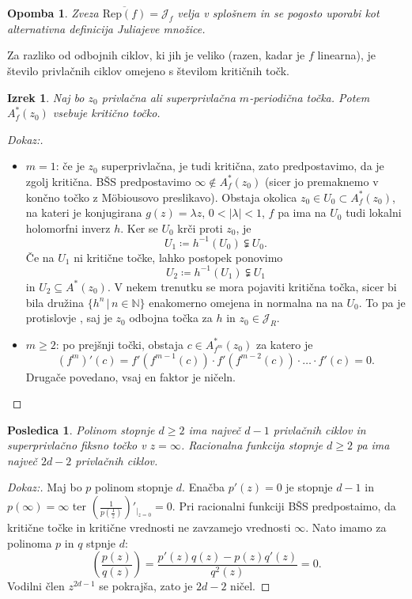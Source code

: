 \documentclass{article}
\newtheorem{posledica}{Posledica}
\newtheorem{opomba}{Opomba}
\newtheorem{izrek}{Izrek}
\newcommand{\N}{\mathbb{N}}
\begin{document}
\begin{opomba}
Zveza $\overline{\text{Rep}(f)} = \mathcal{J}_f$ velja v splošnem in 
se pogosto uporabi kot alternativna  definicija Juliajeve množice.
\end{opomba}

Za razliko od odbojnih ciklov, ki jih je veliko (razen, kadar je $f$ linearna), 
je število privlačnih ciklov omejeno s številom kritičnih točk.

\begin{izrek}
Naj bo $z_0$ privlačna ali superprivlačna $m$-periodična točka. 
Potem $A^*_f(z_0)$ vsebuje kritično točko.
\end{izrek}

\begin{proof}[Dokaz:]
    \hfill
\begin{itemize}
    \item $m=1$: če je $z_0$ superprivlačna, je tudi kritična, zato 
    predpostavimo, da je zgolj kritična. BŠS predpostavimo $\infty \not\in A_f^*(z_0)$ 
    (sicer jo premaknemo v končno točko z Möbiousovo preslikavo). 
    Obstaja okolica $z_0 \in U_0 \subset A_f^*(z_0)$, na kateri 
    je konjugirana $g(z) = \lambda z$, $0 < |\lambda| < 1$, $f$ pa ima 
    na $U_0$ tudi lokalni holomorfni inverz $h$.
    Ker se $U_0$ krči proti $z_0$, je
    $$
    U_1 \coloneqq h^{-1}(U_0) \subsetneqq U_0.
    $$
    Če na $U_1$ ni kritične točke, lahko postopek ponovimo 
    $$
    U_2 \coloneqq h^{-1}(U_1) \subsetneqq U_1
    $$
    in $U_2 \subseteq A^*(z_0)$. V nekem trenutku se mora pojaviti 
    kritična točka, sicer bi bila družina $\{h^n \,|\, n\in \N\}$
     enakomerno omejena in normalna na na $U_0$. To pa je protislovje 
     , saj je $z_0$ odbojna točka za $h$ in $z_0 \in \mathcal{J}_R$.
     \item $m\geq 2$: po prejšnji točki, obstaja $c \in A_{f^m}^*(z_0)$
     za katero je 
     $$
     (f^m)'(c) = f'(f^{m-1}(c)) \cdot f'(f^{m-2}(c)) \cdot \dots \cdot f'(c) = 0. 
     $$
     Drugače povedano, vsaj en faktor je ničeln.
\end{itemize}
\end{proof}

\begin{posledica}
Polinom stopnje $d \geq 2$ ima največ $d - 1$ privlačnih ciklov in 
superprivlačno fiksno točko v $z = \infty$. Racionalna funkcija stopnje
$d \geq 2$ pa ima največ $2d - 2$ privlačnih ciklov.
\end{posledica}

\begin{proof}[Dokaz:]
Maj bo $p$ polinom stopnje $d$. Enačba $p'(z) = 0$ je stopnje $d-1$
in $p(\infty) = \infty$ ter $\left( \frac{1}{p(\frac{1}{z})}\right)'_{\big|_{z=0}} = 0$. 
Pri racionalni funkciji BŠS predpostaimo, da kritične točke in kritične vrednosti 
ne zavzamejo vrednosti $\infty$. Nato imamo za polinoma $p$ in $q$ stpnje $d$:
$$
\left( \frac{p(z)}{q(z)}\right) = \frac{p'(z)q(z) - p(z)q'(z)}{q^2(z)} = 0.
$$
Vodilni člen $z^{2d-1}$ se pokrajša, zato je $2d-2$ ničel.
\end{proof}
\end{document}
